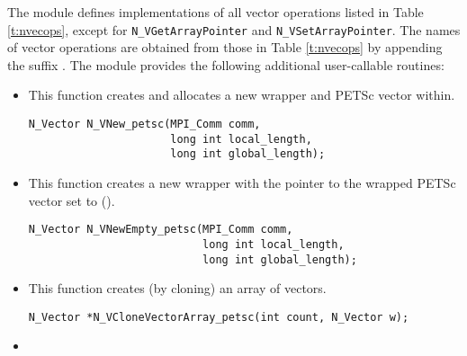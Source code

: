 The {\nvecpetsc} module defines implementations of all vector operations listed 
in Table \ref{t:nvecops}, except for \verb|N_VGetArrayPointer| and 
\verb|N_VSetArrayPointer|. The names of vector operations are obtained from those in 
Table \ref{t:nvecops} by appending the suffix . The module {\nvecpetsc} 
provides the following additional user-callable routines:
\begin{itemize}


\item  {}
  
  This function creates and allocates a new {\nvector} wrapper and PETSc 
  vector within.
 
  

\begin{verbatim}
N_Vector N_VNew_petsc(MPI_Comm comm, 
                      long int local_length, 
                      long int global_length);
\end{verbatim}
  

\item {}
 
  This function creates a new {\nvector} wrapper with the pointer to
  the wrapped PETSc vector set to ().
 
  

\begin{verbatim}
N_Vector N_VNewEmpty_petsc(MPI_Comm comm, 
                           long int local_length, 
                           long int global_length);
\end{verbatim}

  


\item {}
 
  This function creates (by cloning) an array of  {\nvecpetsc} vectors.
 
\begin{verbatim}
N_Vector *N_VCloneVectorArray_petsc(int count, N_Vector w);
\end{verbatim}


\item {}
 

\end{itemize}
